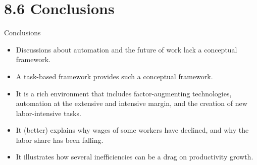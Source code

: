\documentclass[notes=show]{beamer}
\begin{document}
\section{8.6 Conclusions}

\begin{frame}{Conclusions}
\begin{itemize}
\item Discussions about automation and the future of work lack a conceptual framework. \medskip
\item A task-based framework provides such a conceptual framework. \medskip
\item It is a rich environment that includes factor-augmenting technologies, automation at the extensive and intensive margin, and the creation of new labor-intensive tasks. \medskip 
\item It (better) explains why wages of some workers have declined, and why the labor share has been falling. \medskip
\item It illustrates how several inefficiencies can be a drag on productivity growth.
\end{itemize}
\end{frame}
\end{document}

